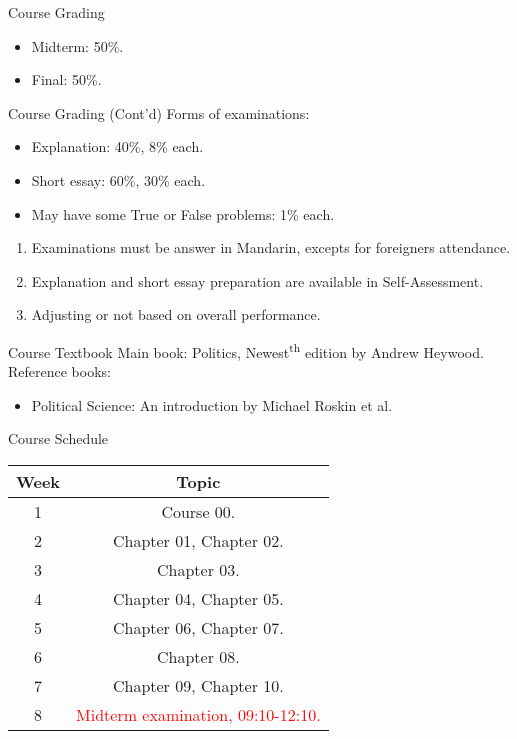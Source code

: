 \documentclass{beamer}
\begin{document}
\begin{frame}{Course Grading}
\begin{itemize}
\pause
\item Midterm: 50\%.
\vspace{1em}
\pause
\item Final: 50\%.
\end{itemize}
\end{frame}
\begin{frame}{Course Grading (Cont'd)}
\pause
Forms of examinations:
\pause
\begin{itemize}
    \item Explanation: 40\%, 8\% each.
    \pause
    \item Short essay: 60\%, 30\% each.
    \pause
    \item May have some True or False problems: 1\% each.
\end{itemize}
\pause
\begin{enumerate}
\item Examinations must be answer in Mandarin, excepts for foreigners attendance.
\pause
\item Explanation and short essay preparation are available in Self-Assessment.
\pause
\item Adjusting or not based on overall performance.
\end{enumerate}
\end{frame}
\begin{frame}{Course Textbook}
\pause
Main book: Politics, Newest\textsuperscript{th} edition by Andrew Heywood. \\
\pause
Reference books:
\begin{itemize}
\pause
\item Political Science: An introduction by Michael Roskin et al.
\end{itemize}
\end{frame}
\begin{frame}{Course Schedule}
\begin{center}
\begin{tabular}{|c|c|}
\hline
Week & Topic \\
\hline
1 & Course 00.\\
\hline
2 & Chapter 01, Chapter 02.\\
\hline
3 & Chapter 03.\\
\hline
4 & Chapter 04, Chapter 05.\\
\hline
5 & Chapter 06, Chapter 07.\\
\hline
6 & Chapter 08.\\
\hline
7 & Chapter 09, Chapter 10.\\
\hline
8 & \textcolor{red}{Midterm examination, 09:10-12:10.}\\
\hline
\end{tabular}
\end{center}
\end{frame}
\end{document}
